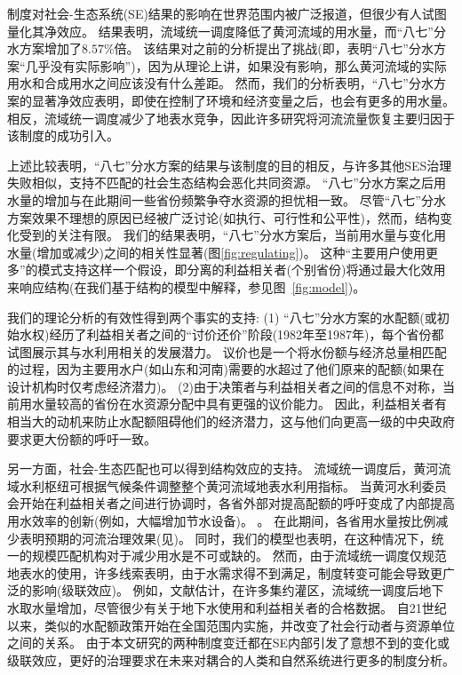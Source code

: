\label{discussion-1}
制度对社会-生态系统(SE)结果的影响在世界范围内被广泛报道，但很少有人试图量化其净效应\cite{cumming2020a}。
结果表明，流域统一调度降低了黄河流域的用水量，而“八七”分水方案增加了$8.57\%$倍。
该结果对之前的分析提出了挑战(即，表明“八七”分水方案“几乎没有实际影响”)，因为从理论上讲，如果没有影响，那么黄河流域的实际用水和合成用水之间应该没有什么差距\cite{abadie2015,hill2021}。
然而，我们的分析表明，“八七”分水方案的显著净效应表明，即使在控制了环境和经济变量之后，也会有更多的用水量。
相反，流域统一调度减少了地表水竞争，因此许多研究将河流流量恢复主要归因于该制度\cite{chen2021,huangang2002,an2007}的成功引入。

\label{discussion-2}
上述比较表明，“八七”分水方案的结果与该制度的目的相反，与许多其他SES治理失败相似，支持不匹配的社会生态结构会恶化共同资源\cite{kellenberg2009,cai2016,barnes2019}。
“八七”分水方案之后用水量的增加与在此期间一些省份频繁争夺水资源的担忧相一致。
尽管“八七”分水方案效果不理想的原因已经被广泛讨论(如执行、可行性和公平性)，然而，结构变化受到的关注有限。
我们的结果表明，“八七”分水方案后，当前用水量与变化用水量(增加或减少)之间的相关性显著(图\ref{fig:regulating})。
这种“主要用户使用更多”的模式支持这样一个假设，即分离的利益相关者(个别省份)将通过最大化效用来响应结构(在我们基于结构的模型中解释，参见图~\ref{fig:model})。

我们的理论分析的有效性得到两个事实的支持:
(1) “八七”分水方案的水配额(或初始水权)经历了利益相关者之间的“讨价还价”阶段(1982年至1987年)\cite{wang2019a, wang2019d}，每个省份都试图展示其与水利用相关的发展潜力。
议价也是一个将水份额与经济总量相匹配的过程，因为主要用水户(如山东和河南)需要的水超过了他们原来的配额(如果在设计机构时仅考虑经济潜力)\cite{zuo2020}。
(2)由于决策者与利益相关者之间的信息不对称，当前用水量较高的省份在水资源分配中具有更强的议价能力。
因此，利益相关者有相当大的动机来防止水配额阻碍他们的经济潜力，这与他们向更高一级的中央政府要求更大份额的呼吁一致\cite{wang2019a, wang2019d}。

\label{discussion-3}
另一方面，社会-生态匹配也可以得到结构效应的支持。
流域统一调度后，黄河流域水利枢纽可根据气候条件调整整个黄河流域地表水利用指标。
当黄河水利委员会开始在利益相关者之间进行协调时，各省外部对提高配额的呼吁变成了内部提高用水效率的创新(例如，大幅增加节水设备)。
\cite{krieger1955, ostrom1990}。
在此期间，各省用水量按比例减少表明预期的河流治理效果(见)。
同时，我们的模型也表明，在这种情况下，统一的规模匹配机构对于减少用水是不可或缺的。
然而，由于流域统一调度仅规范地表水的使用，许多线索表明，由于水需求得不到满足，制度转变可能会导致更广泛的影响(级联效应)。
例如，文献估计，在许多集约灌区，流域统一调度后地下水取水量增加，尽管很少有关于地下水使用和利益相关者的合格数据\cite{sun2022b}。
自21世纪以来，类似的水配额政策开始在全国范围内实施，并改变了社会行动者与资源单位之间的关系。
由于本文研究的两种制度变迁都在SE内部引发了意想不到的变化或级联效应，更好的治理要求在未来对耦合的人类和自然系统进行更多的制度分析。


